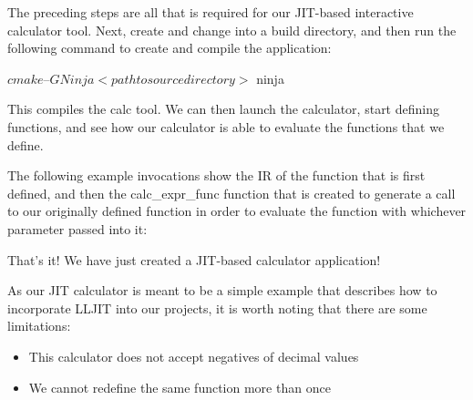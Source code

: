 The preceding steps are all that is required for our JIT-based interactive calculator tool. Next, create and change into a build directory, and then run the following command to create and compile the application:

\begin{shell}
$ cmake –G Ninja <path to source directory>
$ ninja
\end{shell}

This compiles the calc tool. We can then launch the calculator, start defining functions, and see how our calculator is able to evaluate the functions that we define.

The following example invocations show the IR of the function that is first defined, and then the calc\_expr\_func function that is created to generate a call to our originally defined function in order to evaluate the function with whichever parameter passed into it:


That’s it! We have just created a JIT-based calculator application!

As our JIT calculator is meant to be a simple example that describes how to incorporate LLJIT into our projects, it is worth noting that there are some limitations:

\begin{itemize}
\item
This calculator does not accept negatives of decimal values

\item
 We cannot redefine the same function more than once
\end{itemize}

